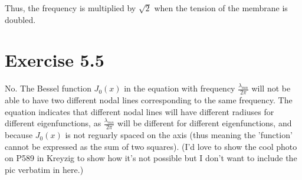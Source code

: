 \documentclass{article}
\begin{document}
Thus, the frequency is multiplied by $\sqrt{2}$ when the tension of the membrane is doubled.

\section*{Exercise 5.5}

No. The Bessel function $J_0(x)$ in the equation with frequency $\frac{\lambda_{mn}}{2\pi}$ will not be able to have two different nodal lines corresponding to the same frequency.
The equation indicates that different nodal lines will have different radiuses for different eigenfunctions, as $\frac{\lambda_{mn}}{2\pi}$ will be different for different eigenfunctions, and because $J_0(x)$ is not reguarly spaced on the axis (thus meaning the 'function' cannot be expressed as the sum of two squares). (I'd love to show the cool photo on P589 in Kreyzig to show how it's not possible but I don't want to include the pic verbatim in here.)
\end{document}
